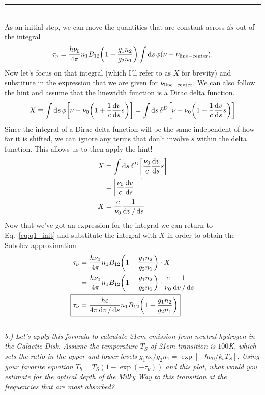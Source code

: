 \documentclass[12pt, letterpaper, twoside]{article}
\newcommand{\answer}[1]{
    \par\noindent\rule{\textwidth}{0.4pt}\\#1\\
}
\begin{document}
\answer{
    As an initial step, we can move the quantities that are constant across $\dd{s}$ out of the integral
    \begin{equation}\label{eq:q1_init}
        \tau_\nu = \frac{h \nu_0}{4 \pi} n_1 B_{12} \qty(1 - \frac{g_1 n_2}{g_2 n_1}) \int \dd{s} \phi(\nu - \nu_{\rm line-center}).
    \end{equation}
    Now let's focus on that integral (which I'll refer to as $X$ for brevity) and substitute in the expression that we are given for $\nu_{\rm line-center}$. We can also follow the hint and assume that the linewidth function is a Dirac delta function.
    \begin{equation}
        X \equiv \int \dd{s} \phi\qty[\nu - \nu_0 \qty(1 + \frac{1}{c} \dv{v}{s} s)] = \int \dd{s} \delta^D\qty[\nu - \nu_0 \qty(1 + \frac{1}{c} \dv{v}{s} s)]
    \end{equation}
    Since the integral of a Dirac delta function will be the same independent of how far it is shifted, we can ignore any terms that don't involve $s$ within the delta function. This allows us to then apply the hint!
    \begin{align}
        X &= \int \dd{s} \delta^D\qty[\frac{\nu_0}{c} \dv{v}{s} s] \\
        &= \abs{ \frac{\nu_0}{c} \dv{v}{s}}^{-1}\\
        X &= \frac{c}{\nu_0} \frac{1}{\dd{v}/\dd{s}}
    \end{align}
    Now that we've got an expression for the integral we can return to Eq.~\ref{eq:q1_init} and substitute the integral with $X$ in order to obtain the Sobolev approximation
    \begin{align}
        \tau_\nu &= \frac{h \nu_0}{4 \pi} n_1 B_{12} \qty(1 - \frac{g_1 n_2}{g_2 n_1}) \cdot X \\
        &= \frac{h \nu_0}{4 \pi} n_1 B_{12} \qty(1 - \frac{g_1 n_2}{g_2 n_1}) \cdot \frac{c}{\nu_0} \frac{1}{\dd{v}/\dd{s}} \\
        \Aboxed{ \tau_\nu&= \frac{h c}{4 \pi \dd{v}/\dd{s}} n_1 B_{12} \qty(1 - \frac{g_1 n_2}{g_2 n_1}) }
    \end{align}
}

{\it b.)  Let's apply this formula to calculate 21cm emission from neutral hydrogen in the Galactic Disk. Assume the temperature $T_S$ of 21cm transition is $100$K, which sets the ratio in the upper and lower levels $g_1 n_2/ g_2 n_1 = \exp[- h \nu_0/ k_bT_S]$. Using your favorite equation $T_b = T_S \left(1 -\exp(-\tau_\nu) \right)$ and this plot, what would you estimate for the optical depth of the Milky Way to this transition at the frequencies that are most absorbed?}
\end{document}
